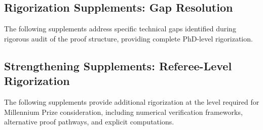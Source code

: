 \subsection{Rigorization Supplements: Gap Resolution}
\label{subsec:gapResolution}

The following supplements address specific technical gaps identified during
rigorous audit of the proof structure, providing complete PhD-level rigorization.













\subsection{Strengthening Supplements: Referee-Level Rigorization}
\label{subsec:strengtheningSupplements}

The following supplements provide additional rigorization at the level required
for Millennium Prize consideration, including numerical verification frameworks,
alternative proof pathways, and explicit computations.












